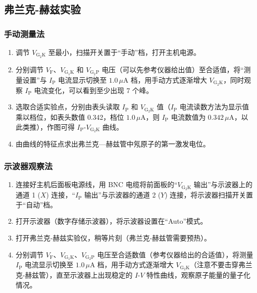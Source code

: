 \documentclass[11pt]{article}
\begin{document}
\subsection{弗兰克-赫兹实验}

\subsubsection{手动测量法}
\begin{enumerate}
    \item 调节 $V_{\text{G}_2\text{K}}$ 至最小，扫描开关置于“手动”档，打开主机电源。
    \item 分别调节 $V_{\text{F}}$、$V_{\text{G}_1\text{K}}$ 和 $V_{\text{G}_2\text{P}}$ 电压（可以先参考仪器给出值）至合适值，将“测量设置”与 $I_{\text{P}}$ 电流显示切换至 $1.0\,\mu\mathrm{A}$ 档，用手动方式逐渐增大 $V_{\text{G}_2\text{K}}$，同时观察 $I_{\text{P}}$ 电流变化，可以看到至少出现 7 个峰。
    \item 选取合适实验点，分别由表头读取 $I_{\text{P}}$ 和 $V_{\text{G}_2\text{K}}$ 值（$I_{\text{P}}$ 电流读数方法为显示值乘以档位，如表头数值 0.342，档位 $1.0\,\mu\mathrm{A}$，则 $I_{\text{P}}$ 电流数值为 $0.342\,\mu\mathrm{A}$，以此类推），作图可得 $I_{\text{P}}\text{-}V_{\text{G}_2\text{K}}$ 曲线。
    \item 由曲线的特征点求出弗兰克—赫兹管中氖原子的第一激发电位。
\end{enumerate}

\subsubsection{示波器观察法}
\begin{enumerate}
    \item 连接好主机后面板电源线，用 BNC 电缆将前面板的“$V_{\text{G}_2\text{K}}$ 输出”与示波器上的通道 1 ($X$) 连接，“$I_{\text{P}}$ 输出”与示波器的通道 2 ($Y$) 连接，将示波器扫描开关置于“自动”档。
    \item 打开示波器（数字存储示波器），将示波器设置在“Auto”模式。
    \item 打开弗兰克-赫兹实验仪，稍等片刻（弗兰克-赫兹管需要预热）。
    \item 分别调节 $V_{\text{F}}$、$V_{\text{G}_1\text{K}}$、$V_{\text{G}_2\text{P}}$ 电压至合适数值（参考仪器给出的合适值），将测量 $I_{\text{P}}$ 电流显示切换至 $1.0\,\mu\mathrm{A}$ 档，用手动方式逐渐增大 $V_{\text{G}_2\text{K}}$（注意不要击穿弗兰克-赫兹管），直至示波器上出现稳定的 $I\text{-}V$ 特性曲线，观察原子能量的量子化情况。
\end{enumerate}
\end{document}
